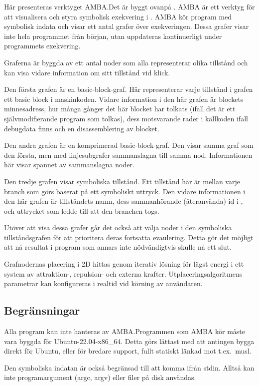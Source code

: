Här presenteras verktyget AMBA.\@ Det är byggt ovanpå \stoe{}. AMBA är ett
verktyg för att visualisera och styra symbolisk exekvering i \stoe{}.
AMBA kör program med symbolisk indata och visar ett antal grafer över
exekveringen. Dessa grafer visar inte hela programmet från början,
utan uppdateras kontinuerligt under programmets exekvering.

Graferna är byggda av ett antal noder som alla representerar olika
tillstånd och kan visa vidare information om sitt tillstånd vid klick.

Den första grafen är en basic-block-graf. Här representerar varje
tillstånd i grafen ett basic block i maskinkoden. Vidare information i
den här grafen är blockets minnesadress, hur många gånger det här
blocket har tolkats (ifall det är ett självmodifierande program som
tolkas), dess motsvarande rader i källkoden ifall debugdata finns och
en disassemblering av blocket.

Den andra grafen är en komprimerad basic-block-graf. Den visar samma
graf som den första, men med linjesubgrafer sammanslagna till samma
nod. Informationen här visar spannet av sammanslagna noder.

Den tredje grafen visar symboliska tillstånd. Ett tillstånd här är
mellan varje branch som görs baserat på ett symboliskt
uttryck. Den vidare informationen i den här grafen är tillståndets
namn, dess sammanhörande (återanvända) id i \stoe, och uttrycket som
ledde till att den branchen togs.

Utöver att visa dessa grafer går det också att välja noder i den
symboliska tillståndsgrafen för att prioritera deras fortsatta
evaulering. Detta gör det möjligt att nå resultat i program som annars
inte nödvändigtvis skulle nå ett slut.

Grafnodernas placering i 2D hittas genom iterativ lösning för lägst
energi i ett system av attraktion-, repulsion- och externa
krafter. Utplaceringsalgoritmens parametrar kan konfigureras i realtid
vid körning av användaren.

\subsection{Begränsningar}

Alla program kan inte hanteras av AMBA.\@ Programmen som AMBA kör måste
vara byggda för Ubuntu-22.04-x86\_64. Detta görs lättast med att
antingen bygga direkt för Ubuntu, eller för bredare support, fullt
statiskt länkad mot t.ex.\ musl.

Den symboliska indatan är också begränsad till att komma ifrån
stdin. Alltså kan inte programargument (argc, argv) eller filer på
disk användas.
